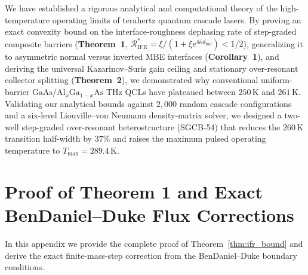 \documentclass[11pt,letterpaper]{article}
\begin{document}
We have established a rigorous analytical and computational theory of the high-temperature operating limits of terahertz quantum cascade lasers. By proving an exact convexity bound on the interface-roughness dephasing rate of step-graded composite barriers (\textbf{Theorem~1}, $\mathcal{R}_{\mathrm{IFR}}^* = \xi/(1 + \xi e^{4\bar{\kappa} d_{\mathrm{buf}}}) < 1/2$), generalizing it to asymmetric normal versus inverted MBE interfaces (\textbf{Corollary~1}), and deriving the universal Kazarinov--Suris gain ceiling and stationary over-resonant collector splitting (\textbf{Theorem~2}), we demonstrated why conventional uniform-barrier $\mathrm{GaAs}/\mathrm{Al}_x\mathrm{Ga}_{1-x}\mathrm{As}$ THz QCLs have plateaued between $250\,\mathrm{K}$ and $261\,\mathrm{K}$. Validating our analytical bounds against $2{,}000$ random cascade configurations and a six-level Liouville--von Neumann density-matrix solver, we designed a two-well step-graded over-resonant heterostructure (SGCB-54) that reduces the $260\,\mathrm{K}$ transition half-width by $37\%$ and raises the maximum pulsed operating temperature to $T_{\max} = 289.4\,\mathrm{K}$.

\appendix

\section{Proof of Theorem 1 and Exact BenDaniel--Duke Flux Corrections}
\label{app:proof_thm1}

In this appendix we provide the complete proof of Theorem~\ref{thm:ifr_bound} and derive the exact finite-mass-step correction from the BenDaniel--Duke boundary conditions.
\end{document}
